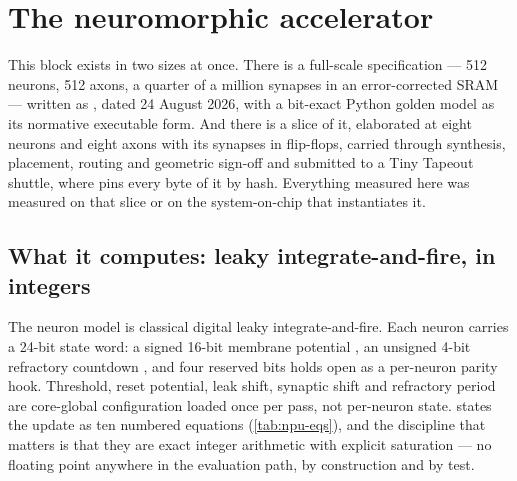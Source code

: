 
\chapter{The neuromorphic accelerator}
\label{ch:npu}

This block exists in two sizes at once. There is a full-scale
specification --- 512 neurons, 512 axons, a quarter of a million
synapses in an error-corrected SRAM --- written as , dated
24 August 2026, with a bit-exact Python golden model as its normative
executable form. And there is a slice of it, elaborated at eight
neurons and eight axons with its synapses in flip-flops, carried
through synthesis, placement, routing and geometric sign-off and
submitted to a Tiny Tapeout shuttle, where  pins every byte
of it by hash. Everything measured here was measured on that slice or
on the system-on-chip that instantiates it.

\section{What it computes: leaky integrate-and-fire, in integers}

The neuron model is classical digital leaky integrate-and-fire. Each
neuron carries a 24-bit state word: a signed 16-bit membrane potential
, an unsigned 4-bit refractory countdown , and four
reserved bits  holds open as a per-neuron parity
hook. Threshold, reset potential, leak shift, synaptic shift and
refractory period are core-global configuration loaded once per pass,
not per-neuron state.  states the update as ten
numbered equations (\cref{tab:npu-eqs}), and the discipline that
matters is that they are exact integer arithmetic with explicit
saturation --- no floating point anywhere in the evaluation path, by
construction and by test.

